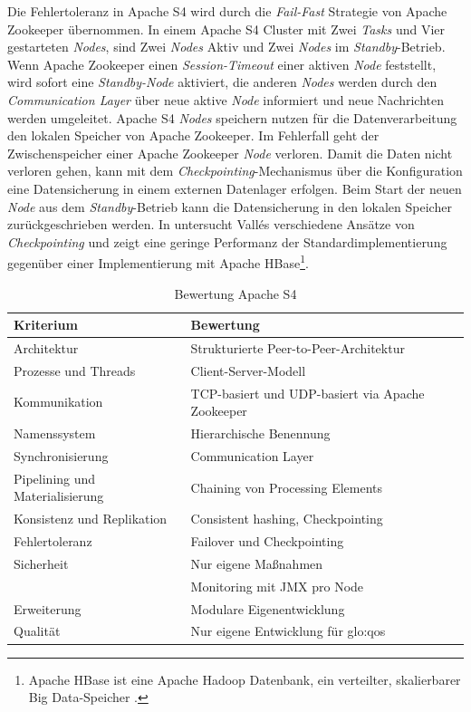 Die Fehlertoleranz in Apache S4 wird durch die \textit{Fail-Fast} Strategie von Apache Zookeeper übernommen. In einem Apache S4 Cluster mit Zwei \textit{Tasks} und Vier gestarteten \textit{Nodes}, sind Zwei \textit{Nodes} Aktiv und Zwei \textit{Nodes} im \textit{Standby}-Betrieb. Wenn Apache Zookeeper einen \textit{Session-Timeout} einer aktiven \textit{Node} feststellt, wird sofort eine \textit{Standby-Node} aktiviert, die anderen \textit{Nodes} werden durch den \textit{Communication Layer} über neue aktive \textit{Node} informiert und neue Nachrichten werden umgeleitet. Apache S4 \textit{Nodes} speichern nutzen für die Datenverarbeitung den lokalen Speicher von Apache Zookeeper. Im Fehlerfall geht der Zwischenspeicher einer Apache Zookeeper \textit{Node} verloren. Damit die Daten nicht verloren gehen, kann mit dem \textit{Checkpointing}-Mechanismus über die Konfiguration eine Datensicherung in einem externen Datenlager erfolgen. Beim Start der neuen \textit{Node} aus dem \textit{Standby}-Betrieb kann die Datensicherung in den lokalen Speicher zurückgeschrieben werden. In  untersucht Vall{\'e}s verschiedene Ansätze von \textit{Checkpointing} und zeigt eine geringe Performanz der Standardimplementierung gegenüber einer Implementierung mit Apache HBase\footnote{Apache HBase ist eine Apache Hadoop Datenbank, ein verteilter, skalierbarer Big Data-Speicher .}. 

\begin{table}[!ht]
	\centering
		\begin{tabular}{@{}ll@{}} \toprule
			\textbf{Kriterium} & \textbf{Bewertung} \\ \midrule
			Architektur & Strukturierte Peer-to-Peer-Architektur \\
			Prozesse und Threads & Client-Server-Modell \\
			Kommunikation & TCP-basiert und UDP-basiert via Apache Zookeeper \\
			Namenssystem & Hierarchische Benennung \\
			Synchronisierung & Communication Layer \\
			Pipelining und Materialisierung & Chaining von Processing Elements  \\
			Konsistenz und Replikation & Consistent hashing, Checkpointing \\
			Fehlertoleranz & Failover und Checkpointing \\ 
			Sicherheit & Nur eigene Maßnahmen \\
			& Monitoring mit JMX pro Node \\
			Erweiterung & Modulare Eigenentwicklung \\
			Qualität & Nur eigene Entwicklung für \gls{glo:qos}  \\
			\bottomrule			
		\end{tabular}
	\caption{Bewertung Apache S4}
	\label{tab:bews4}
\end{table}

